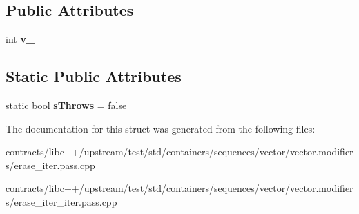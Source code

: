 \subsection*{Public Attributes}
\begin{DoxyCompactItemize}
\item 
\mbox{\label{struct_throws_acd6804aa58bc2436f224839da83a8f9f}} 
int {\bfseries v\+\_\+}
\end{DoxyCompactItemize}
\subsection*{Static Public Attributes}
\begin{DoxyCompactItemize}
\item 
\mbox{\label{struct_throws_a69a151ea34283dc512a5d9aca8b20dc1}} 
static bool {\bfseries s\+Throws} = false
\end{DoxyCompactItemize}


The documentation for this struct was generated from the following files\+:\begin{DoxyCompactItemize}
\item 
contracts/libc++/upstream/test/std/containers/sequences/vector/vector.\+modifiers/erase\+\_\+iter.\+pass.\+cpp\item 
contracts/libc++/upstream/test/std/containers/sequences/vector/vector.\+modifiers/erase\+\_\+iter\+\_\+iter.\+pass.\+cpp\end{DoxyCompactItemize}
